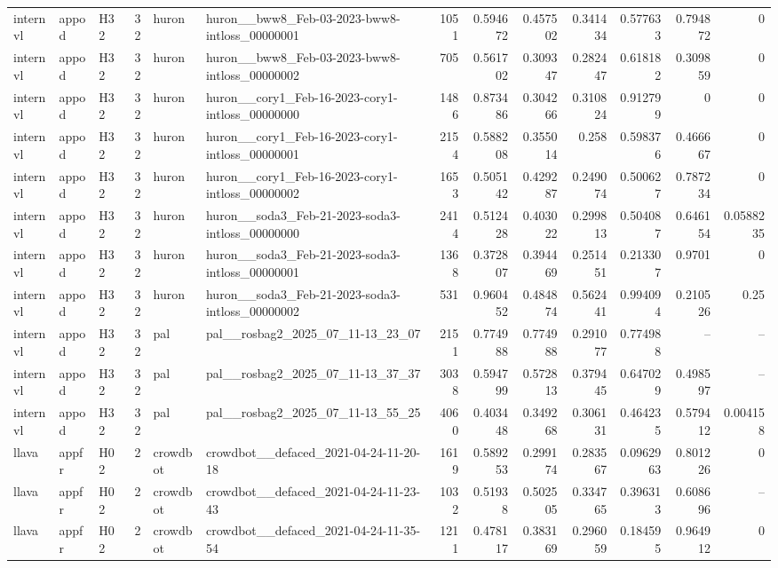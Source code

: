 \begin{longtable}{lllrllrrrrrrr}
internvl & appod & H32 & 32 & huron & huron\_\_bww8\_Feb-03-2023-bww8-intloss\_00000001 & 1051 & 0.594672 & 0.457502 & 0.341434 & 0.577633 & 0.794872 & 0 \\
internvl & appod & H32 & 32 & huron & huron\_\_bww8\_Feb-03-2023-bww8-intloss\_00000002 & 705 & 0.561702 & 0.309347 & 0.282447 & 0.618182 & 0.309859 & 0 \\
internvl & appod & H32 & 32 & huron & huron\_\_cory1\_Feb-16-2023-cory1-intloss\_00000000 & 1486 & 0.873486 & 0.304266 & 0.310824 & 0.912799 & 0 & 0 \\
internvl & appod & H32 & 32 & huron & huron\_\_cory1\_Feb-16-2023-cory1-intloss\_00000001 & 2154 & 0.588208 & 0.355014 & 0.258 & 0.598376 & 0.466667 & 0 \\
internvl & appod & H32 & 32 & huron & huron\_\_cory1\_Feb-16-2023-cory1-intloss\_00000002 & 1653 & 0.505142 & 0.429287 & 0.249074 & 0.500627 & 0.787234 & 0 \\
internvl & appod & H32 & 32 & huron & huron\_\_soda3\_Feb-21-2023-soda3-intloss\_00000000 & 2414 & 0.512428 & 0.403022 & 0.299813 & 0.504087 & 0.646154 & 0.0588235 \\
internvl & appod & H32 & 32 & huron & huron\_\_soda3\_Feb-21-2023-soda3-intloss\_00000001 & 1368 & 0.372807 & 0.394469 & 0.251451 & 0.213307 & 0.9701 & 0 \\
internvl & appod & H32 & 32 & huron & huron\_\_soda3\_Feb-21-2023-soda3-intloss\_00000002 & 531 & 0.960452 & 0.484874 & 0.562441 & 0.994094 & 0.210526 & 0.25 \\
internvl & appod & H32 & 32 & pal & pal\_\_rosbag2\_2025\_07\_11-13\_23\_07 & 2151 & 0.774988 & 0.774988 & 0.291077 & 0.774988 & -- & -- \\
internvl & appod & H32 & 32 & pal & pal\_\_rosbag2\_2025\_07\_11-13\_37\_37 & 3038 & 0.594799 & 0.572813 & 0.379445 & 0.647029 & 0.498597 & -- \\
internvl & appod & H32 & 32 & pal & pal\_\_rosbag2\_2025\_07\_11-13\_55\_25 & 4060 & 0.403448 & 0.349268 & 0.306131 & 0.464235 & 0.579412 & 0.004158 \\
llava & appfr & H02 & 2 & crowdbot & crowdbot\_\_defaced\_2021-04-24-11-20-18 & 1619 & 0.589253 & 0.299174 & 0.283567 & 0.0962963 & 0.801226 & 0 \\
llava & appfr & H02 & 2 & crowdbot & crowdbot\_\_defaced\_2021-04-24-11-23-43 & 1032 & 0.51938 & 0.502505 & 0.334765 & 0.396313 & 0.608696 & -- \\
llava & appfr & H02 & 2 & crowdbot & crowdbot\_\_defaced\_2021-04-24-11-35-54 & 1211 & 0.478117 & 0.383169 & 0.296059 & 0.184595 & 0.964912 & 0 \\

\end{longtable}
